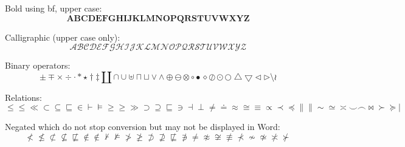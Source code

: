 Bold using bf, upper case:
\begin{equation}
\mathbf{A}  \mathbf{B}  \mathbf{C}  \mathbf{D}  \mathbf{E}  \mathbf{F}  \mathbf{G}  \mathbf{H}  \mathbf{I}  \mathbf{J}  \mathbf{K}  \mathbf{L}  \mathbf{M}  \mathbf{N}  \mathbf{O}  \mathbf{P}  \mathbf{Q}  \mathbf{R}  \mathbf{S}  \mathbf{T}  \mathbf{U}  \mathbf{V}  \mathbf{W}  \mathbf{X}  \mathbf{Y}  \mathbf{Z}
\end{equation}

Calligraphic (upper case only):
\begin{equation}
\mathcal{A}  \mathcal{B}  \mathcal{C}  \mathcal{D}  \mathcal{E}  \mathcal{F}  \mathcal{G}  \mathcal{H}  \mathcal{I}  \mathcal{J}  \mathcal{K}  \mathcal{L}  \mathcal{M}  \mathcal{N}  \mathcal{O}  \mathcal{P}  \mathcal{Q}  \mathcal{R}  \mathcal{S}  \mathcal{T}  \mathcal{U}  \mathcal{V}  \mathcal{W}  \mathcal{X}  \mathcal{Y}  \mathcal{Z}
\end{equation}

Binary operators:
\begin{equation}
\pm \mp \times \div \cdot \ast \star \dagger \ddagger \amalg \cap \cup \uplus \sqcap \sqcup \vee \wedge \oplus \ominus \otimes \circ \bullet \diamond \oslash \odot \bigcirc \bigtriangleup \bigtriangledown \triangleleft \triangleright \setminus \wr
\end{equation}

Relations:
\begin{equation}
\le \leq \ll \subset \subseteq \sqsubseteq \in \vdash \models \ge \geq \gg \supset \supseteq \sqsubseteq \ni \dashv \perp \neq \doteq \approx \cong \equiv \propto \prec \preceq \parallel \| \sim \simeq \asymp \smile \frown \bowtie \succ \succeq \mid
\end{equation}

Negated which do not stop conversion but may not be displayed in Word:
\begin{equation}
\not< \not\leq \not\subset \not\subseteq \not\sqsubseteq \not\in \notin \not\vdash \not\models \not> \not\geq \not\supset \not\supseteq \not\sqsubseteq \not\ni \not= \not\approx \not\cong \not\equiv \not\prec \not\sim \not\simeq \not\asymp \not\succ 
\end{equation}


